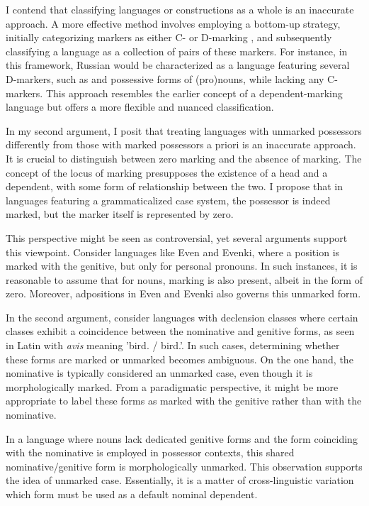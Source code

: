 I contend that classifying languages or constructions as a whole is an inaccurate approach. A more effective method involves employing a bottom-up strategy, initially categorizing markers as either C- or D-marking \citep{lander2020head}, and subsequently classifying a language as a collection of pairs of these markers. For instance, in this framework, Russian would be characterized as a language featuring several D-markers, such as \Gen{} and possessive forms of (pro)nouns, while lacking any C-markers. This approach resembles the earlier concept of a dependent-marking language but offers a more flexible and nuanced classification.

In my second argument, I posit that treating languages with unmarked possessors differently from those with marked possessors a priori is an inaccurate approach. It is crucial to distinguish between zero marking and the absence of marking. The concept of the locus of marking presupposes the existence of a head and a dependent, with some form of relationship between the two. I propose that in languages featuring a grammaticalized case system, the possessor is indeed marked, but the marker itself is represented by zero.

This perspective might be seen as controversial, yet several arguments support this viewpoint. Consider languages like Even and Evenki, where a position is marked with the genitive, but only for personal pronouns. In such instances, it is reasonable to assume that for nouns, marking is also present, albeit in the form of zero. Moreover, adpositions in Even and Evenki also governs this unmarked form.

In the second argument, consider languages with declension classes where certain classes exhibit a coincidence between the nominative and genitive forms, as seen in Latin with \textit{avis} meaning 'bird.\Nom{} / bird.\Gen{}'. In such cases, determining whether these forms are marked or unmarked becomes ambiguous. On the one hand, the nominative is typically considered an unmarked case, even though it is morphologically marked. From a paradigmatic perspective, it might be more appropriate to label these forms as marked with the genitive rather than with the nominative.

In a language where nouns lack dedicated genitive forms and the form coinciding with the nominative is employed in possessor contexts, this shared nominative/genitive form is morphologically unmarked. This observation supports the idea of unmarked case. Essentially, it is a matter of cross-linguistic variation which form must be used as a default nominal dependent.

